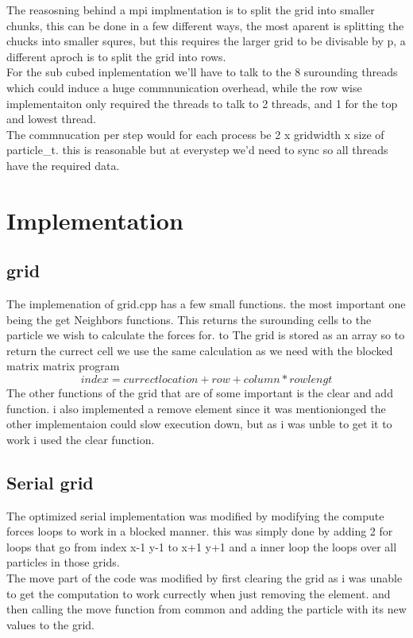 \documentclass[a4paper,10pt,titlepage]{report}
\begin{document}
The reasosning behind a mpi implmentation is to split the grid into smaller chunks, this can be done in a few different ways, the most aparent is splitting the chucks into smaller squres, but this requires the larger grid to be divisable by p, a different aproch is to split the grid into rows. \\
For the sub cubed inplementation we'll have to talk to the 8 surounding threads which could induce a huge commnunication overhead, while the row wise implementaiton only required the threads to talk to 2 threads, and 1 for the top and lowest thread. \\

The commnucation per step would for each process be 2 x gridwidth x size of particle\_t. this is reasonable but at everystep we'd need to sync so all threads have the required data. \\

\newpage

\section{Implementation}
\subsection{grid}
The implemenation of grid.cpp has a few small functions. the most important one being the get Neighbors functions. This returns the surounding cells to the particle we wish to calculate the forces for. to The grid is stored as an array so to return the currect cell we use the same calculation as we need with the blocked matrix matrix program
\begin{equation}
index = currect location + row + column * rowlengt
\end{equation}
The other functions of the grid that are of some important is the clear and add function. i also implemented a remove element since it was mentionionged the other implementaion could slow execution down, but as i was unble to get it to work i used the clear function.

\subsection{Serial grid}

The optimized serial implementation was modified by modifying the compute forces loops to work in a blocked manner. this was simply done by adding 2 for loops that go from index x-1 y-1 to x+1 y+1 and a inner loop the loops over all particles in those grids.\\
The move part of the code was modified by first clearing the grid as i was unable to get the computation to work currectly when just removing the element. and then calling the move function from common and adding the particle with its new values to the grid. 
\end{document}
